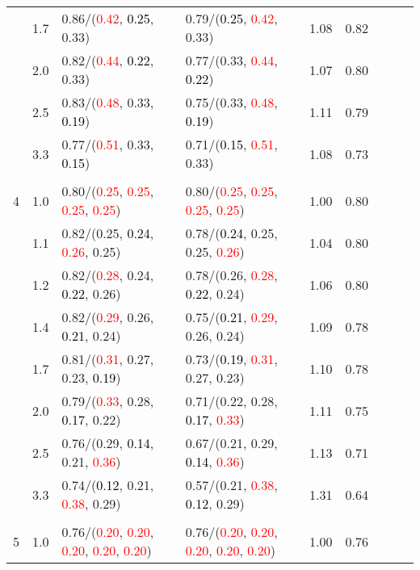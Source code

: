 \documentclass[10pt,a4paper]{report}
\begin{document}
\begin{table}[!htbp]
\begin{center}
{\begin{tabular}{ccllccccc}
			&1.7&0.86/(\textcolor{red}{0.42}, \textcolor{black}{0.25}, 0.33)&0.79/(\textcolor{black}{0.25}, \textcolor{red}{0.42}, 0.33)&1.08&0.82\\
			&2.0&0.82/(\textcolor{red}{0.44}, \textcolor{black}{0.22}, 0.33)&0.77/(0.33, \textcolor{red}{0.44}, \textcolor{black}{0.22})&1.07&0.80\\
			&2.5&0.83/(\textcolor{red}{0.48}, 0.33, \textcolor{black}{0.19})&0.75/(0.33, \textcolor{red}{0.48}, \textcolor{black}{0.19})&1.11&0.79\\
			&3.3&0.77/(\textcolor{red}{0.51}, 0.33, \textcolor{black}{0.15})&0.71/(\textcolor{black}{0.15}, \textcolor{red}{0.51}, 0.33)&1.08&0.73\\
			&&&&\\
			4			&1.0&0.80/(\textcolor{red}{0.25}, \textcolor{red}{0.25}, \textcolor{red}{0.25}, \textcolor{red}{0.25})&0.80/(\textcolor{red}{0.25}, \textcolor{red}{0.25}, \textcolor{red}{0.25}, \textcolor{red}{0.25})&1.00&0.80\\
			&1.1&0.82/(0.25, \textcolor{black}{0.24}, \textcolor{red}{0.26}, 0.25)&0.78/(\textcolor{black}{0.24}, 0.25, 0.25, \textcolor{red}{0.26})&1.04&0.80\\
			&1.2&0.82/(\textcolor{red}{0.28}, 0.24, \textcolor{black}{0.22}, 0.26)&0.78/(0.26, \textcolor{red}{0.28}, \textcolor{black}{0.22}, 0.24)&1.06&0.80\\
			&1.4&0.82/(\textcolor{red}{0.29}, 0.26, \textcolor{black}{0.21}, 0.24)&0.75/(\textcolor{black}{0.21}, \textcolor{red}{0.29}, 0.26, 0.24)&1.09&0.78\\
			&1.7&0.81/(\textcolor{red}{0.31}, 0.27, 0.23, \textcolor{black}{0.19})&0.73/(\textcolor{black}{0.19}, \textcolor{red}{0.31}, 0.27, 0.23)&1.10&0.78\\
			&2.0&0.79/(\textcolor{red}{0.33}, 0.28, \textcolor{black}{0.17}, 0.22)&0.71/(0.22, 0.28, \textcolor{black}{0.17}, \textcolor{red}{0.33})&1.11&0.75\\
			&2.5&0.76/(0.29, \textcolor{black}{0.14}, 0.21, \textcolor{red}{0.36})&0.67/(0.21, 0.29, \textcolor{black}{0.14}, \textcolor{red}{0.36})&1.13&0.71\\
			&3.3&0.74/(\textcolor{black}{0.12}, 0.21, \textcolor{red}{0.38}, 0.29)&0.57/(0.21, \textcolor{red}{0.38}, \textcolor{black}{0.12}, 0.29)&1.31&0.64\\
			&&&&\\
			5			&1.0&0.76/(\textcolor{red}{0.20}, \textcolor{red}{0.20}, \textcolor{red}{0.20}, \textcolor{red}{0.20}, \textcolor{red}{0.20})&0.76/(\textcolor{red}{0.20}, \textcolor{red}{0.20}, \textcolor{red}{0.20}, \textcolor{red}{0.20}, \textcolor{red}{0.20})&1.00&0.76\\

\end{tabular}}
\end{center}
\end{table}
\end{document}
